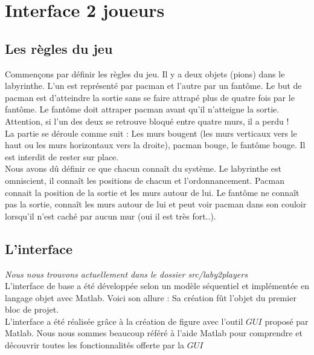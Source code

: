 \chapter{Interface 2 joueurs} \label{sec:chap1}
\section{Les règles du jeu}\label{sec:reglesDuJeu}
Commençons par définir les règles du jeu. Il y a deux objets (pions) dans le labyrinthe. L'un est représenté par pacman et l'autre par un fantôme. Le but de pacman est d'atteindre la sortie sans se faire attrapé plus de quatre fois par le fantôme. Le fantôme doit attraper pacman avant qu'il n'atteigne la sortie. Attention, si l'un des deux se retrouve bloqué entre quatre murs, il a perdu !\\
La partie se déroule comme suit : Les murs bougent (les murs verticaux vers le haut ou les murs horizontaux vers la droite), pacman bouge, le fantôme bouge. Il est interdit de rester sur place.\\
Nous avons dû définir ce que chacun connaît du système. Le labyrinthe est omniscient, il connaît les positions de chacun et l'ordonnancement. Pacman connait la position de la sortie et les murs autour de lui. Le fantôme ne connaît pas la sortie, connaît les murs autour de lui et peut voir pacman dans son couloir lorsqu'il n'est caché par aucun mur (oui il est très fort..).




\section{L'interface}
\textit{Nous nous trouvons actuellement dans le dossier src/laby2players}\\
L'interface de base a été développée selon un modèle séquentiel et implémentée en langage objet avec Matlab. Voici son allure :
Sa création fût l'objet du premier bloc de projet.\\
L'interface a été réalisée grâce à la création de figure avec l'outil $GUI$ proposé par Matlab. Nous nous sommes beaucoup référé à l'aide Matlab pour comprendre et découvrir toutes les fonctionnalités offerte par la $GUI$


